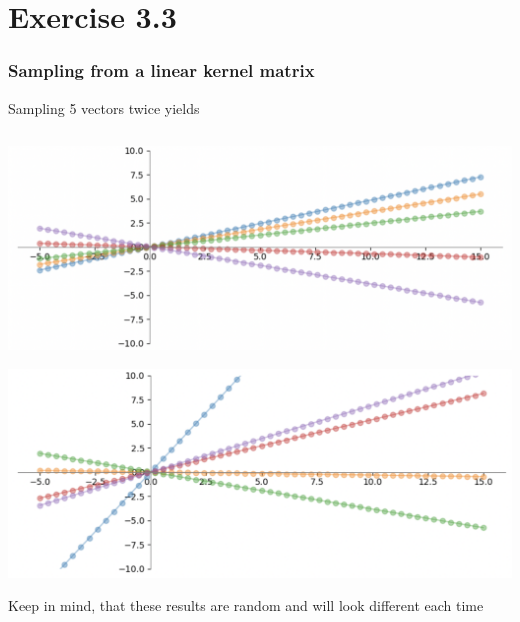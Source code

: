 \documentclass[10pt,aspectratio=169,handout]{beamer}
\begin{document}
\section{Exercise 3.3}

\begin{frame}
    \frametitle{Sampling from a linear kernel matrix}

    Sampling 5 vectors twice yields

    \inputminted[bgcolor=LightGray,fontsize=\small]{python}{code/linear_sampling.py}

    \begin{minipage}{0.49\textwidth}
        \includegraphics[width=\textwidth]{images/ex3.3.1a.png}
    \end{minipage}
    \begin{minipage}{0.49\textwidth}
        \includegraphics[width=\textwidth]{images/ex3.3.1b.png}
    \end{minipage}

    Keep in mind, that these results are random and will look different each time

\end{frame}
\end{document}

